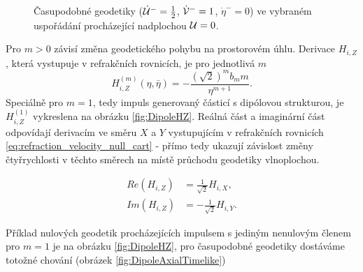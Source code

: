 \begin{figure}[ht]
    \centering
    \caption{Časupodobné geodetiky ($\dot {\mathcal{U}}^-=\frac{1}{2}$, $\dot {\mathcal{V}}^-=1$, $\dot \eta^-=0$) ve vybraném uspořádání procházející nadplochou $\mathcal{U} = 0$.}
    \label{fig:AsMatterNonAxial}
\end{figure}
Pro $m>0$ závisí změna geodetického pohybu na prostorovém úhlu. Derivace $H_{i,Z}$, která vystupuje v refrakčních rovnicích, je pro jednotlivá $m$
\begin{equation}
    H_{i,Z}^{(m)}(\eta, \bar{\eta}) = -\frac{(\sqrt{2})^{m} b_m m}{\eta^{m+1}}.
\end{equation}
Speciálně pro $m=1$, tedy impuls generovaný částicí s dipólovou strukturou, je $H_{i,Z}^{(1)}$ vykreslena na obrázku \ref{fig:DipoleHZ}. Reálná část a imaginární část
odpovídají derivacím ve směru $X$ a $Y$ vystupujícím v refrakčních rovnicích \eqref{eq:refraction_velocity_null_cart} - přímo tedy ukazují závislost změny čtyřrychlosti v těchto směrech na místě průchodu geodetiky vlnoplochou.

\begin{equation}
    \begin{split}
        Re(H_{i,Z}) &= \frac{1}{\sqrt{2}} H_{i,X}, \\
        Im(H_{i,Z}) &=-\frac{1}{\sqrt{2}}H_{i,Y}.
    \end{split}
\end{equation}


Příklad nulových geodetik procházejících impulsem s jediným nenulovým členem pro $m=1$ je na obrázku \ref{fig:DipoleHZ}, pro časupodobné geodetiky dostáváme totožné
chování (obrázek \ref{fig:DipoleAxialTimelike})

